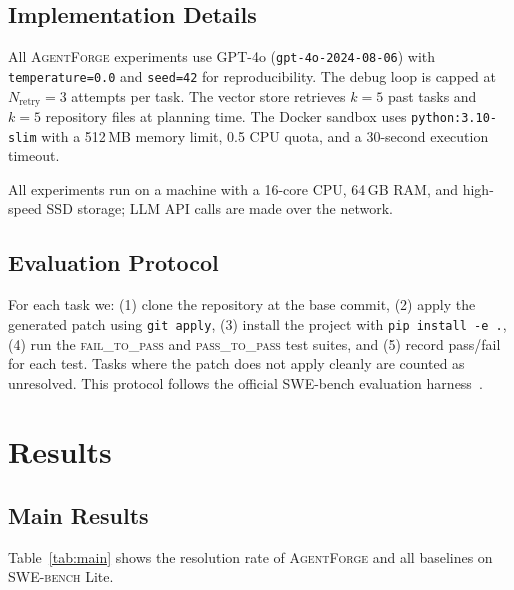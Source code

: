 \documentclass[journal]{IEEEtran}
\newcommand{\agentforge}{\textsc{AgentForge}}
\newcommand{\swebench}{\textsc{SWE-bench}}
\begin{document}
\subsection{Implementation Details}

All \agentforge{} experiments use GPT-4o (\texttt{gpt-4o-2024-08-06}) with \texttt{temperature=0.0} and \texttt{seed=42} for reproducibility. The debug loop is capped at $N_\text{retry}=3$ attempts per task. The vector store retrieves $k=5$ past tasks and $k=5$ repository files at planning time. The Docker sandbox uses \texttt{python:3.10-slim} with a 512\,MB memory limit, 0.5 CPU quota, and a 30-second execution timeout.

All experiments run on a machine with a 16-core CPU, 64\,GB RAM, and high-speed SSD storage; LLM API calls are made over the network.

\subsection{Evaluation Protocol}

For each task we: (1) clone the repository at the base commit, (2) apply the generated patch using \texttt{git apply}, (3) install the project with \texttt{pip install -e .}, (4) run the \textsc{fail\_to\_pass} and \textsc{pass\_to\_pass} test suites, and (5) record pass/fail for each test. Tasks where the patch does not apply cleanly are counted as unresolved. This protocol follows the official SWE-bench evaluation harness~\cite{jimenez2024swebench}.


\section{Results}
\label{sec:results}

\subsection{Main Results}

Table~\ref{tab:main} shows the resolution rate of \agentforge{} and all baselines on \swebench{} Lite.
\end{document}
